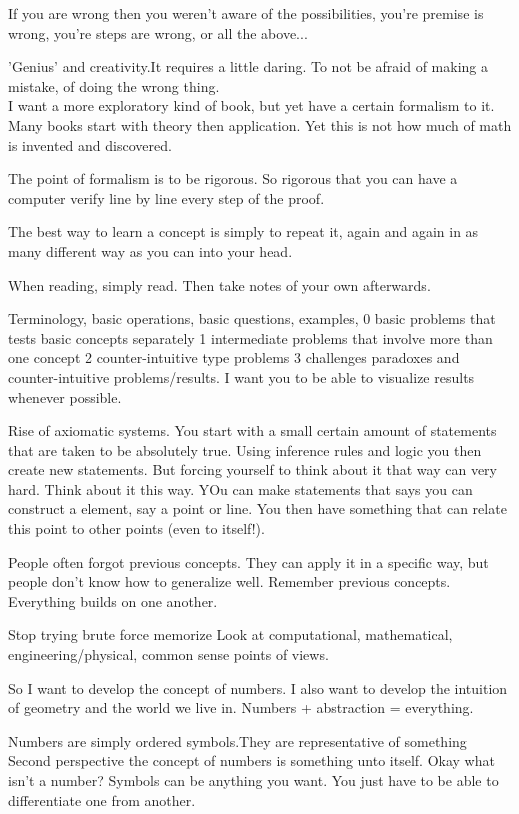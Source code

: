 \documentclass{book}
\begin{document}
If you are wrong then you weren't aware of the possibilities, you're premise is wrong, you're steps are wrong, or all the above...

'Genius' and creativity.It requires a little daring. To not be afraid of making a mistake, of doing the wrong thing. \\
 I want a more exploratory kind of book, but yet have a certain formalism to it. Many books start with theory then application. Yet this is not how much of math is invented and discovered. 

 The point of formalism is to be rigorous. So rigorous that you can have a computer verify line by line every step of the proof. 

The best way to learn a concept is simply to repeat it, again and again in as many different way as you can into your head. 

When reading, simply read. Then take notes of your own afterwards. 

Terminology, basic operations, basic questions, examples,
0 basic problems that tests basic concepts separately
1 intermediate problems that involve more than one concept 
2 counter-intuitive type problems
3 challenges
paradoxes and counter-intuitive problems/results.
I want you to be able to visualize results whenever possible. 

Rise of axiomatic systems. You start with a small certain amount of statements that are taken to be absolutely true. Using inference rules and logic you then create new statements.
But forcing yourself to think about it that way can very hard.
Think about it this way. YOu can make statements that says you can construct a element, say a point or line. You then have something that can relate this point to other points (even to itself!). 






People often forgot previous concepts. They can apply it in a specific way, but people
don't know how to generalize well. 
Remember previous concepts. Everything builds on one another. 

Stop trying brute force memorize 
Look at computational, mathematical, engineering/physical, common sense points of views.

So I want to develop the concept of numbers. I also want to develop the intuition of geometry and the world we live in.
Numbers + abstraction = everything. 

Numbers are simply ordered symbols.They are representative of something
Second perspective the concept of numbers is something unto itself. 
Okay what isn't a number? Symbols can be anything you want. You just have to be able to differentiate one from another. 
\end{document}
